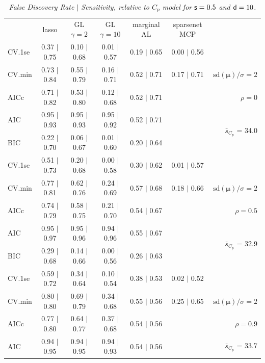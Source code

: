 \documentclass[12pt]{article}
\newcommand{\mr}[1]{\mathrm{#1}}
\newcommand{\bm}[1]{\mathbf{#1}}
\begin{document}
\begin{table}[p]\vspace{-.5cm}
\caption[l]{\it False Discovery Rate $\mid$ Sensitivity, relative to $C_p$ model  for ${\sf s}=0.5$ and ${\sf d}=10$.}
\vspace{-.5cm}
\small{}
\begin{center}
\begin{tabular}{l*{5}{c}|r}
 & lasso & GL $\gamma=2$ & GL $\gamma=10$ & marginal AL & sparsenet MCP  & \\
 \cline{1-7}
CV.1se & 0.37 $\mid$ 0.75 & 0.10 $\mid$ 0.68 & 0.01 $\mid$ 0.57 & 0.19 $\mid$ 0.65 & 0.00 $\mid$ 0.56 &\\
CV.min & 0.73 $\mid$ 0.84 & 0.55 $\mid$ 0.79 & 0.16 $\mid$ 0.71 & 0.52 $\mid$ 0.71 & 0.17 $\mid$ 0.71 &  $\mr{sd}(\bm{\mu})/\sigma=2$ \\
AICc & 0.71 $\mid$ 0.82 & 0.53 $\mid$ 0.80 & 0.12 $\mid$ 0.68 & 0.52 $\mid$ 0.71 & & $\rho=0$ \\
AIC & 0.95 $\mid$ 0.93 & 0.95 $\mid$ 0.93 & 0.95 $\mid$ 0.92 & 0.52 $\mid$ 0.71 & & \multirow{2}{*}{$\bar{s}_{C_p}$ = 34.0} \\
BIC & 0.22 $\mid$ 0.70 & 0.06 $\mid$ 0.67 & 0.01 $\mid$ 0.60 & 0.20 $\mid$ 0.64 & & \\
 \hline 
CV.1se & 0.51 $\mid$ 0.73 & 0.20 $\mid$ 0.68 & 0.00 $\mid$ 0.58 & 0.30 $\mid$ 0.62 & 0.01 $\mid$ 0.57 &\\
CV.min & 0.77 $\mid$ 0.81 & 0.62 $\mid$ 0.76 & 0.24 $\mid$ 0.69 & 0.57 $\mid$ 0.68 & 0.18 $\mid$ 0.66 &  $\mr{sd}(\bm{\mu})/\sigma=2$ \\
AICc & 0.74 $\mid$ 0.79 & 0.58 $\mid$ 0.75 & 0.21 $\mid$ 0.70 & 0.54 $\mid$ 0.67 & & $\rho=0.5$ \\
AIC & 0.95 $\mid$ 0.97 & 0.95 $\mid$ 0.96 & 0.94 $\mid$ 0.96 & 0.55 $\mid$ 0.67 & & \multirow{2}{*}{$\bar{s}_{C_p}$ = 32.9} \\
BIC & 0.29 $\mid$ 0.68 & 0.14 $\mid$ 0.66 & 0.00 $\mid$ 0.56 & 0.26 $\mid$ 0.63 & & \\
 \hline 
CV.1se & 0.59 $\mid$ 0.72 & 0.34 $\mid$ 0.64 & 0.10 $\mid$ 0.54 & 0.38 $\mid$ 0.53 & 0.02 $\mid$ 0.52 &\\
CV.min & 0.80 $\mid$ 0.80 & 0.69 $\mid$ 0.79 & 0.34 $\mid$ 0.68 & 0.55 $\mid$ 0.56 & 0.25 $\mid$ 0.65 &  $\mr{sd}(\bm{\mu})/\sigma=2$ \\
AICc & 0.77 $\mid$ 0.80 & 0.64 $\mid$ 0.77 & 0.37 $\mid$ 0.68 & 0.54 $\mid$ 0.56 & & $\rho=0.9$ \\
AIC & 0.94 $\mid$ 0.95 & 0.94 $\mid$ 0.95 & 0.94 $\mid$ 0.93 & 0.54 $\mid$ 0.56 & & \multirow{2}{*}{$\bar{s}_{C_p}$ = 33.7} \\

\end{tabular}
\end{center}
\end{table}
\end{document}
